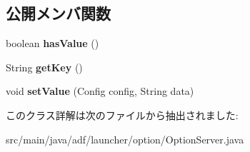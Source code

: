 \subsection*{公開メンバ関数}
\begin{DoxyCompactItemize}
\item 
\hypertarget{classadf_1_1launcher_1_1option_1_1OptionServer_aba5dd0c624edc9c0e2fe244c2de8bb45}{}\label{classadf_1_1launcher_1_1option_1_1OptionServer_aba5dd0c624edc9c0e2fe244c2de8bb45} 
boolean {\bfseries has\+Value} ()
\item 
\hypertarget{classadf_1_1launcher_1_1option_1_1OptionServer_aec747674c4e4ff8d11405d3478bd89e9}{}\label{classadf_1_1launcher_1_1option_1_1OptionServer_aec747674c4e4ff8d11405d3478bd89e9} 
String {\bfseries get\+Key} ()
\item 
\hypertarget{classadf_1_1launcher_1_1option_1_1OptionServer_a0450c78767f67a76d85606541869f66d}{}\label{classadf_1_1launcher_1_1option_1_1OptionServer_a0450c78767f67a76d85606541869f66d} 
void {\bfseries set\+Value} (Config config, String data)
\end{DoxyCompactItemize}


このクラス詳解は次のファイルから抽出されました\+:\begin{DoxyCompactItemize}
\item 
src/main/java/adf/launcher/option/Option\+Server.\+java\end{DoxyCompactItemize}
